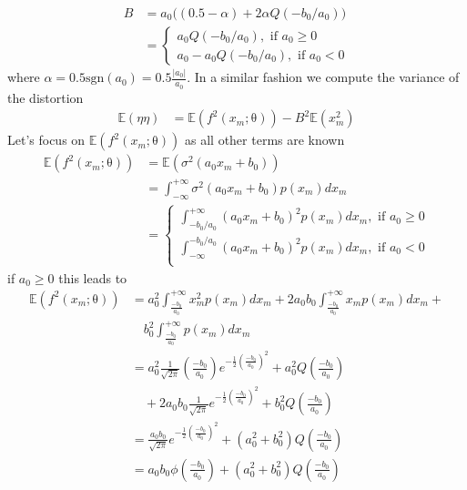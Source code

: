 \documentclass[12pt]{article}
\newcommand{\vect}[1]{\boldsymbol{\mathrm{#1}}}
\newcommand{\expt}[1]{\mathbb{E}\left(#1\right)}
\theoremstyle{remark}
\begin{document}
\begin{align}
	B &= a_0 \big((0.5-\alpha) + 2\alpha Q(-b_0/a_0)\big)\\
	&= \begin{cases}
		a_0Q(-b_0/a_0),  \text{  if } a_0\geq 0\\
		a_0 - a_0Q(-b_0/a_0),  \text{  if } a_0<0
	\end{cases}
\end{align}
where $\alpha = 0.5 \mathrm{sgn}(a_0) = 0.5\frac{|a_0|}{a_0}$.
In a similar fashion we compute the variance of the distortion 
\begin{align}
	\expt{\eta \eta} &= \expt{f^2(x_m; \vect{\theta})} - B^2\expt{x_m^2}
\end{align}
Let's focus on $\expt{f^2(x_m; \vect{\theta})}$ as all other terms are known
\begin{align}
	\expt{f^2(x_m; \vect{\theta})} &= \expt{\sigma^2(a_0 x_m + b_0)}\\
	&= \int_{-\infty}^{+\infty} \sigma^2(a_0 x_m + b_0) p(x_m) dx_m\\
	&= \begin{cases}
		\int_{-b_0/a_0}^{+\infty} (a_0 x_m + b_0)^2 p(x_m) dx_m ,  \text{  if } a_0\geq 0\\
		\int_{-\infty}^{-b_0/a_0} (a_0 x_m + b_0)^2 p(x_m) dx_m ,  \text{  if } a_0 < 0\\
	\end{cases}
\end{align}
if $a_0\geq0$ this leads to 
\begin{align}
	\expt{f^2(x_m; \vect{\theta})}	&=  a_0^2 \int_{\frac{-b_0}{a_0}}^{+\infty} x_m^2 p(x_m) dx_m +2 a_0 b_0 \int_{\frac{-b_0}{a_0}}^{+\infty} x_m p(x_m) dx_m +\\ & \quad b_0^2 \int_{\frac{-b_0}{a_0}}^{+\infty} p(x_m) dx_m \\
	&= a_0^2 \frac{1}{\sqrt{2\pi}} \left(\frac{-b_0}{a_0}\right) e^{-\frac{1}{2} \left(\frac{-b_0}{a_0}\right)^2} + a_0^2 Q\left(\frac{-b_0}{a_0}\right) \\
	& \quad + 2a_0b_0 \frac{1}{\sqrt{2\pi}} e^{-\frac{1}{2} \left(\frac{-b_0}{a_0}\right)^2} + b_0^2 Q\left(\frac{-b_0}{a_0}\right)\\
	&= \frac{a_0 b_0}{\sqrt{2\pi}} e^{-\frac{1}{2} \left(\frac{-b_0}{a_0}\right)^2} + (a_0^2 + b_0^2) Q\left(\frac{-b_0}{a_0}\right)\\
	&= a_0b_0 \phi\left(\frac{-b_0}{a_0}\right) + (a_0^2 + b_0^2) Q\left(\frac{-b_0}{a_0}\right)
\end{align}
\end{document}
